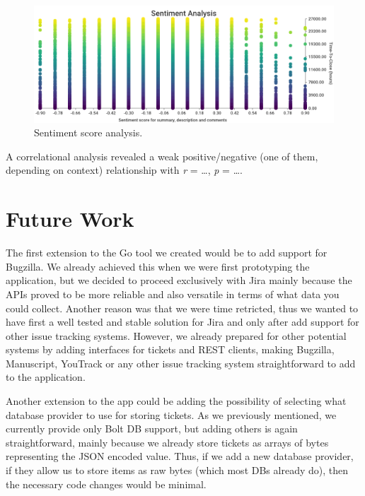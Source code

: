 \documentclass{mpaper}
\begin{document}
\begin{figure}[ht]
  \begin{center}
    \includegraphics[scale=0.23]{images/sentiment_analysis.png}
  \end{center}
  \caption{\label{sentiment}Sentiment score analysis.}
\end{figure}

A correlational analysis revealed a weak positive/negative (one of them, depending on context) relationship
with \emph{r} = \dots, \emph{p} = \dots.

\section{Future Work}\label{future_work}

The first extension to the Go tool we created would be to add support for Bugzilla. We already achieved this 
when we were first prototyping the application, but we decided to proceed exclusively with Jira mainly because 
the APIs proved to be more reliable and also versatile in terms of what data you could collect. Another 
reason was that we were time retricted, thus we wanted to have first a well tested and stable solution for Jira and 
only after add support for other issue tracking systems. However, we already prepared for other potential systems by 
adding interfaces for tickets and REST clients, making Bugzilla, Manuscript, YouTrack or any 
other issue tracking system straightforward to add to the application.

Another extension to the app could be adding the possibility of selecting what database provider to use 
for storing tickets. As we previously mentioned, we currently provide only Bolt DB support, but adding others is 
again straightforward, mainly because we already store tickets as arrays of bytes representing the JSON encoded 
value. Thus, if we add a new database provider, if they allow us to store items as raw bytes (which most DBs already 
do), then the necessary code changes would be minimal.
\end{document}
